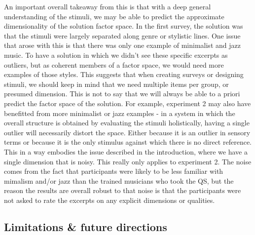 \documentclass[
  english,
  man,floatsintext]{apa6}
\begin{document}
An important overall takeaway from this is that with a deep general understanding of the stimuli, we may be able to predict the approximate dimensionality of the solution factor space. In the first survey, the solution was that the stimuli were largely separated along genre or stylistic lines. One issue that arose with this is that there was only one example of minimalist and jazz music. To have a solution in which we didn't see these specific excerpts as outliers, but as coherent members of a factor space, we would need more examples of those styles. This suggests that when creating surveys or designing stimuli, we should keep in mind that we need multiple items per group, or presumed dimension. This is not to say that we will always be able to a priori predict the factor space of the solution. For example, experiment 2 may also have benefitted from more minimalist or jazz examples - in a system in which the overall structure is obtained by evaluating the stimuli holistically, having a single outlier will necessarily distort the space. Either because it is an outlier in sensory terms or because it is the only stimulus against which there is no direct reference. This in a way embodies the issue described in the introduction, where we have a single dimension that is noisy. This really only applies to experiment 2. The noise comes from the fact that participants were likely to be less familiar with mimalism and/or jazz than the trained musicians who took the QS, but the reason the results are overall robust to that noise is that the participants were not asked to rate the excerpts on any explicit dimensions or qualities.

\hypertarget{limitations-future-directions}{%
\subsection{Limitations \& future directions}\label{limitations-future-directions}}
\end{document}
